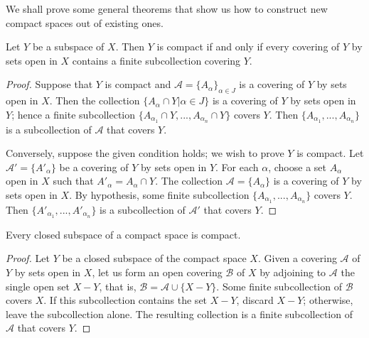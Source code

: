 \documentclass[a4paper,english,12pt]{article}
\begin{document}
We shall prove some general theorems that show us how to construct new
compact spaces out of existing ones.

\begin{lem}
	Let $Y$ be a subspace of $X$. Then $Y$ is compact if and only if every covering of $Y$ by sets open in $X$ contains a finite subcollection covering $Y$.
\end{lem}
\begin{proof}
	Suppose that $Y$ is compact and $\mathcal{A} = \{A_\alpha\}_{\alpha \in J}$ is a covering of $Y$ by sets open in $X$. Then the collection
	$\{A_\alpha \cap Y | \alpha \in J \}$
	is a covering of $Y$ by sets open in $Y$; hence a finite subcollection
	$ \{A_{\alpha_1} \cap Y, ... , A_{\alpha_n} \cap Y \}$ 
	covers $Y$. Then $\{A_{\alpha_1}, ...,A_{\alpha_n}\}$ is a subcollection of $\mathcal{A}$ that covers $Y$. 
	
	Conversely, suppose the given condition holds; we wish to prove $Y$ is compact. Let $\mathcal{A}' = \{A'_\alpha \}$ be a covering of $Y$ by sets open in $Y$. For each $\alpha$, choose a set $A_\alpha$ open in $X$ such that $A'_\alpha = A_\alpha \cap Y$. The collection $\mathcal{A} = \{A_\alpha\}$ is a covering of $Y$ by sets open in $X$. By hypothesis, some finite subcollection $\{A_{\alpha_1},..., A_{\alpha_n}\}$ covers $Y$. Then $\{A'_{\alpha_1},..., A'_{\alpha_n}\}$ is a subcollection of $\mathcal{A}'$ that covers $Y$.
\end{proof}

\begin{thm}\label{thm26.2}
	Every closed subspace of a compact space is compact.
\end{thm}
\begin{proof}
	Let $Y$ be a closed subspace of the compact space $X$. Given a covering $\mathcal{A}$ of $Y$ by sets open in $X$, let us form an open covering $\mathcal{B}$ of $X$ by adjoining to $\mathcal{A}$ the single open set $X - Y$, that is, $\mathcal{B} = \mathcal{A} \cup \{X - Y\}$.
	Some finite subcollection of $\mathcal{B}$ covers $X$. If this subcollection contains the set $X - Y$, discard $X - Y$; otherwise, leave the subcollection alone. The resulting collection is a finite subcollection of $\mathcal{A}$ that covers $Y$.
\end{proof}
\end{document}
